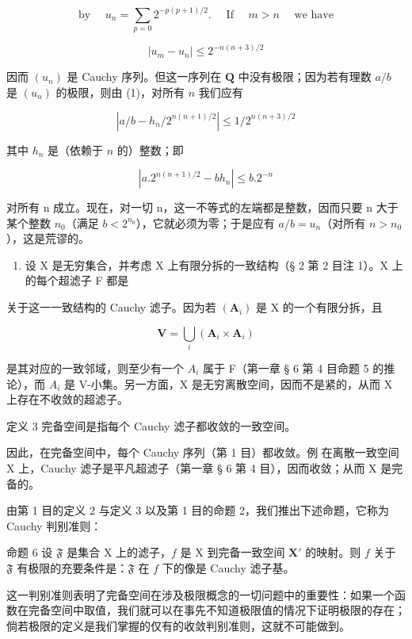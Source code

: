\[
\text { by } \quad u _ {n} = \sum_ {p = 0} 2 ^ {- p (p + 1) / 2}. \quad \text { If } \quad m > n \quad \text { we   have }\tag{1}
\]

\[
\left| u _ {m} - u _ {n} \right| \leqslant 2 ^ {- n (n + 3) / 2}
\]

因而 \((u_{n})\) 是 Cauchy 序列。但这一序列在 \(\mathbf{Q}\) 中没有极限；因为若有理数 \(a / b\) 是 \((u_{n})\) 的极限，则由 (1)，对所有 \(n\) 我们应有

\[
\left| a / b - h _ {n} / 2 ^ {n (n + 1) / 2} \right| \leqslant 1 / 2 ^ {n (n + 3) / 2}
\]

其中 \(h_n\) 是（依赖于 \(n\) 的）整数；即

\[
\left| a. 2 ^ {n (n + 1) / 2} - b h _ {n} \right| \leqslant b. 2 ^ {- n}
\]

对所有 n 成立。现在，对一切 n，这一不等式的左端都是整数，因而只要 n 大于某个整数 \(n_{0}\)（满足 \(b < 2^{n_{0}}\)），它就必须为零；于是应有 \(a/b = u_{n}\)（对所有 \(n > n_{0}\)），这是荒谬的。

\begin{enumerate}
\def\labelenumi{\arabic{enumi})}
\setcounter{enumi}{1}
\tightlist
\item
  设 X 是无穷集合，并考虑 X 上有限分拆的一致结构（§ 2 第 2 目注 1）。X 上的每个超滤子 F 都是
\end{enumerate}

关于这一一致结构的 Cauchy 滤子。因为若 \((\mathbf{A}_{i})\) 是 X 的一个有限分拆，且

\[
\mathbf {V} = \bigcup_ {i} (\mathbf {A} _ {i} \times \mathbf {A} _ {i})
\]

是其对应的一致邻域，则至少有一个 \(A_{i}\) 属于 F（第一章 § 6 第 4 目命题 5 的推论），而 \(A_{i}\) 是 V-小集。另一方面，X 是无穷离散空间，因而不是紧的，从而 X 上存在不收敛的超滤子。

定义 3 完备空间是指每个 Cauchy 滤子都收敛的一致空间。

因此，在完备空间中，每个 Cauchy 序列（第 1 目）都收敛。例 在离散一致空间 X 上，Cauchy 滤子是平凡超滤子（第一章 § 6 第 4 目），因而收敛；从而 X 是完备的。

由第 1 目的定义 2 与定义 3 以及第 1 目的命题 2，我们推出下述命题，它称为 Cauchy 判别准则：

命题 6 设 \(\mathfrak{F}\) 是集合 X 上的滤子，\(f\) 是 X 到完备一致空间 \(\mathbf{X}'\) 的映射。则 \(f\) 关于 \(\mathfrak{F}\) 有极限的充要条件是：\(\mathfrak{F}\) 在 \(f\) 下的像是 Cauchy 滤子基。

这一判别准则表明了完备空间在涉及极限概念的一切问题中的重要性：如果一个函数在完备空间中取值，我们就可以在事先不知道极限值的情况下证明极限的存在；倘若极限的定义是我们掌握的仅有的收敛判别准则，这就不可能做到。

